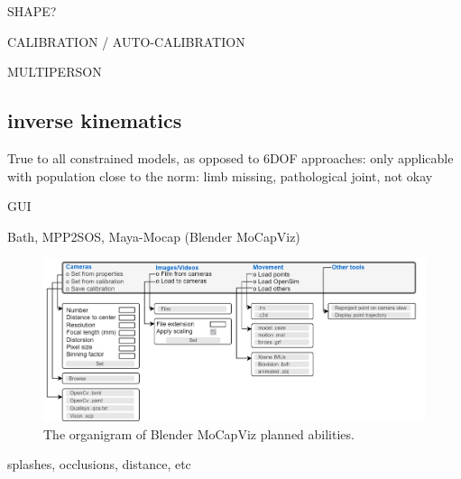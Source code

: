 SHAPE?

CALIBRATION / AUTO-CALIBRATION

MULTIPERSON

\subsection{inverse kinematics}
True to all constrained models, as opposed to 6DOF approaches: only applicable with population close to the norm: limb missing, pathological joint, not okay


GUI

Bath, MPP2SOS, Maya-Mocap (Blender MoCapViz)


\begin{figure}[hbtp]
      \centering
      \def\svgwidth{1\columnwidth}
      \fontsize{10pt}{10pt}\selectfont
      \includegraphics[width=\linewidth]{"../Chap3/Figures/Fig_MayaMocap3.png"}
      \caption{The organigram of Blender MoCapViz planned abilities.}
      \label{fig_blendermocap}
\end{figure}


splashes, occlusions, distance, etc